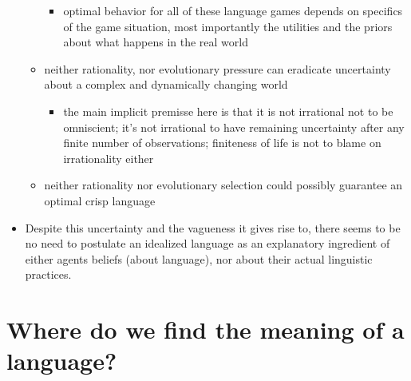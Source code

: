 \documentclass[fleqn,reqno,10pt]{article}
\begin{document}
\begin{itemize}
\begin{itemize}
\begin{itemize}
\begin{enumerate}
      \end{enumerate}
    \item optimal behavior for all of these language games depends on specifics of the game
      situation, most importantly the utilities and the priors about what happens in the real
      world
    \end{itemize}
  \item neither rationality, nor evolutionary pressure can eradicate uncertainty about a
    complex and dynamically changing world
    \begin{itemize}
    \item the main implicit premisse here is that it is not irrational not to be omniscient;
      it's not irrational to have remaining uncertainty after any finite number of
      observations; finiteness of life is not to blame on irrationality either
    \end{itemize}
  \item neither rationality nor evolutionary selection could possibly guarantee an optimal
    crisp language
  \end{itemize}
\item Despite this uncertainty and the vagueness it gives rise to, there seems to be no need to
  postulate an idealized language as an explanatory ingredient of either agents beliefs (about
  language), nor about their actual linguistic practices.
\end{itemize}

\section*{Where do we find the meaning of a language?}
\end{document}
